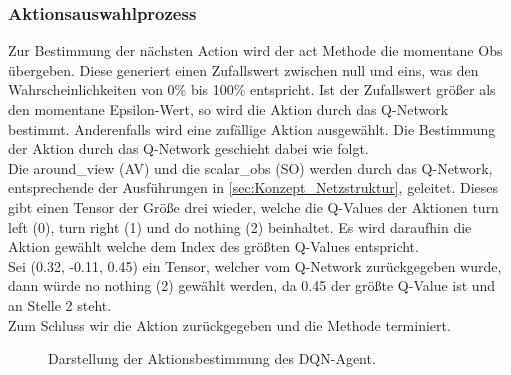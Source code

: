 \subsubsection{Aktionsauswahlprozess} \label{sec:Konzept_Aktionsauswahlprozess_DQN}
Zur Bestimmung der nächsten Action wird der act Methode die momentane Obs übergeben.
Diese generiert einen Zufallswert zwischen null und eins, was den Wahrscheinlichkeiten von 0\% bis 100\% entspricht.
Ist der Zufallswert größer als den momentane Epsilon-Wert, so wird die Aktion durch das Q-Network bestimmt. Anderenfalls wird eine zufällige Aktion ausgewählt. Die Bestimmung der Aktion durch das Q-Network geschieht dabei wie folgt.\\
Die around\_view (AV) und die scalar\_obs (SO) werden durch das Q-Network, entsprechende der Ausführungen in \ref{sec:Konzept_Netzstruktur}, geleitet. Dieses gibt einen Tensor der Größe drei wieder, welche die Q-Values der Aktionen turn left (0), turn right (1) und do nothing (2) beinhaltet.
Es wird daraufhin die Aktion gewählt welche dem Index des größten Q-Values entspricht.\\
Sei (0.32, -0.11, 0.45) ein Tensor, welcher vom Q-Network zurückgegeben wurde, dann würde no nothing (2) gewählt werden, da 0.45 der größte Q-Value ist und an Stelle 2 steht.\\
Zum Schluss wir die Aktion zurückgegeben und die Methode terminiert.
\begin{figure}[H]
	\centering
	\def\svgscale{0.13}
	
	\caption[DQN-Aktionsbestimmung]{Darstellung der Aktionsbestimmung des DQN-Agent.}
	\label{fig:DQN-Aktionsbestimmung}
\end{figure}

